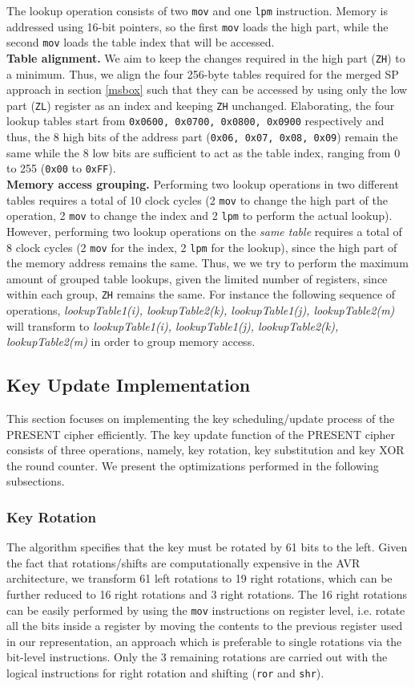 \documentclass[11pt]{llncs2e} %
\begin{document}
The lookup operation consists of two \texttt{mov} and one \texttt{lpm} instruction. Memory is addressed using 16-bit pointers, so the first \texttt{mov} loads the high part, while the second \texttt{mov} loads the table index that will be accessed.\\
\textbf{Table alignment.} We aim to keep the changes required in the high part (\texttt{ZH}) to a minimum. Thus, we align the four 256-byte tables required for the merged SP approach in section \ref{msbox} such that they can be accessed by using only the  low part (\texttt{ZL}) register as an index and keeping \texttt{ZH} unchanged. Elaborating, the four lookup tables start from \texttt{0x0600, 0x0700, 0x0800, 0x0900} respectively and thus, the 8 high bits of the address part (\texttt{0x06, 0x07, 0x08, 0x09}) remain the same while the 8 low bits are sufficient to act as the table index, ranging from 0 to 255 (\texttt{0x00} to \texttt{0xFF}). \\
\textbf{Memory access grouping.} Performing two lookup operations in two different tables requires a total of 10 clock cycles (2 \texttt{mov} to change the high part of the operation, 2 \texttt{mov} to change the index and 2 \texttt{lpm} to perform the actual lookup). However, performing two lookup operations on the \emph{same table} requires a total of 8 clock cycles (2 \texttt{mov} for the index, 2 \texttt{lpm} for the lookup), since the high part of the memory address remains the same. Thus, we 
we try to perform the maximum amount of grouped table lookups, given the limited number of registers, since within each group, \texttt{ZH} remains the same. For instance the following sequence of operations, \emph{ lookupTable1(i), lookupTable2(k), lookupTable1(j), lookupTable2(m)} will transform to \emph{ lookupTable1(i), lookupTable1(j), lookupTable2(k), lookupTable2(m)} in order to group memory access.
\subsection{Key Update Implementation}
This section focuses on implementing the key scheduling/update process of the PRESENT cipher efficiently. The key update function of the PRESENT cipher consists of three operations, namely, key rotation, key substitution and key XOR the round counter. We present the optimizations performed in the following subsections.
\subsubsection{Key Rotation}
The algorithm specifies that the key must be rotated by 61 bits to the left. Given the fact that rotations/shifts are computationally expensive in the AVR architecture, we transform 61 left rotations to 19 right rotations, which can be further reduced to 16 right rotations and 3 right rotations. The 16 right rotations can be easily performed by using the \texttt{mov} instructions on register level, i.e. rotate all the bits inside a register by moving the contents to the previous register used in our representation, an approach which is preferable to single rotations via the bit-level instructions. Only the 3 remaining rotations are carried out with the logical instructions for right rotation and shifting (\texttt{ror} and \texttt{shr}).
\end{document}
